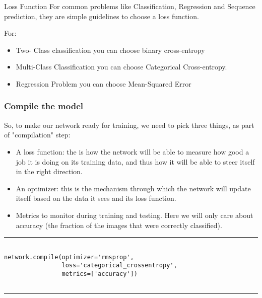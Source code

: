 \documentclass[11pt]{beamer}
\begin{document}
\begin{frame}{Loss Function}
For common problems like Classification, Regression and Sequence prediction, they are simple guidelines to choose a loss function. 

\vspace{0.5cm}
For: \begin{itemize}
\item Two- Class classification you can choose binary cross-entropy
\item Multi-Class Classification you can choose Categorical Cross-entropy.
\item Regression Problem you can choose Mean-Squared Error
\end{itemize}
\end{frame}
\begin{frame}[fragile]
\frametitle{Compile the model}
\scriptsize

So, to make our network ready for training, we need to pick three things, as part of "compilation" step:
\begin{itemize}
\item A loss function: the is how the network will be able to measure how good a job it is doing on its training data, and thus how it will be 
able to steer itself in the right direction.
\item  An optimizer: this is the mechanism through which the network will update itself based on the data it sees and its loss function.
\item Metrics to monitor during training and testing. Here we will only care about accuracy (the fraction of the images that were correctly 
classified).
\end{itemize}

\rule{\textwidth}{1pt}
\begin{verbatim}

network.compile(optimizer='rmsprop',
                loss='categorical_crossentropy',
                metrics=['accuracy'])
                
\end{verbatim}
\rule{\textwidth}{1pt}
\end{frame}
\end{document}
